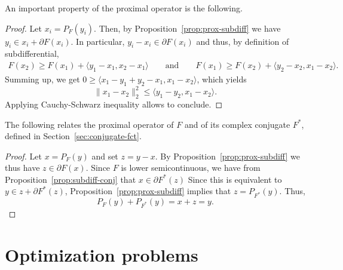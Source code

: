 \documentclass{report}
\begin{document}
An important property of the proximal operator is the following.


\begin{proof}
	Let $x_i = P_F(y_i)$. Then, by Proposition~\ref{prop:prox-subdiff} we have $y_i \in x_i+\partial F(x_i)$. In particular, $y_i - x_i \in \partial F(x_i)$ and thus, by definition of subdifferential,
	\begin{gather}
		F(x_2) \ge F(x_1) + \langle y_1-x_1,x_2-x_1 \rangle 
		\qquad\text{and}\qquad
		F(x_1) \ge F(x_2) + \langle y_2-x_2,x_1-x_2 \rangle .
	\end{gather}
	Summing up, we get $0\ge \langle x_1-y_1+y_2-x_1,x_1-x_2 \rangle$, which yields
	\begin{equation}
		\|x_1-x_2\|_2^2 \le \langle y_1-y_2,x_1-x_2\rangle.
	\end{equation}
	Applying Cauchy-Schwarz inequality allows to conclude.
\end{proof}

The following relates the proximal operator of $F$ and of its complex conjugate $F^*$, defined in Section~\ref{sec:conjugate-fct}.


\begin{proof}
	Let $x = P_F(y)$ and set $z=y-x$. By Proposition~\ref{prop:prox-subdiff} we thus have $z\in \partial F(x)$. Since $F$ is lower semicontinuous, we have from Proposition~\ref{prop:subdiff-conj} that $x\in \partial F^*(z)$ Since this is equivalent to $y\in z + \partial F^*(z)$, Proposition~\ref{prop:prox-subdiff} implies that $z = P_{F^*}(y)$. Thus,
	\begin{equation}
		P_F(y) + P_{F^*}(y) = x + z = y.
	\end{equation}
\end{proof}


\chapter{Optimization problems}
\end{document}
